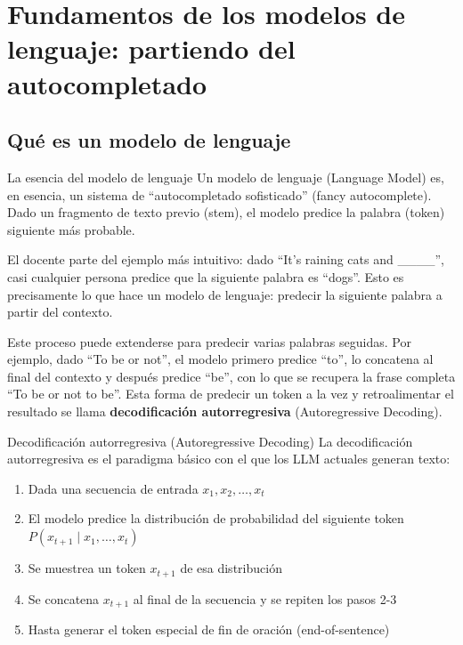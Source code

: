 \section{Fundamentos de los modelos de lenguaje: partiendo del autocompletado}

\subsection{Qué es un modelo de lenguaje}

\begin{importantbox}{La esencia del modelo de lenguaje}
Un modelo de lenguaje (Language Model) es, en esencia, un sistema de ``autocompletado sofisticado'' (fancy autocomplete). Dado un fragmento de texto previo (stem), el modelo predice la palabra (token) siguiente más probable.
\end{importantbox}

El docente parte del ejemplo más intuitivo: dado ``It's raining cats and \_\_\_\_'', casi cualquier persona predice que la siguiente palabra es ``dogs''. Esto es precisamente lo que hace un modelo de lenguaje: predecir la siguiente palabra a partir del contexto.

Este proceso puede extenderse para predecir varias palabras seguidas. Por ejemplo, dado ``To be or not'', el modelo primero predice ``to'', lo concatena al final del contexto y después predice ``be'', con lo que se recupera la frase completa ``To be or not to be''. Esta forma de predecir un token a la vez y retroalimentar el resultado se llama \textbf{decodificación autorregresiva} (Autoregressive Decoding).

\begin{knowledgebox}{Decodificación autorregresiva (Autoregressive Decoding)}
La decodificación autorregresiva es el paradigma básico con el que los LLM actuales generan texto:
\begin{enumerate}
    \item Dada una secuencia de entrada $x_1, x_2, \dots, x_t$
    \item El modelo predice la distribución de probabilidad del siguiente token $P(x_{t+1} \mid x_1, \dots, x_t)$
    \item Se muestrea un token $x_{t+1}$ de esa distribución
    \item Se concatena $x_{t+1}$ al final de la secuencia y se repiten los pasos 2-3
    \item Hasta generar el token especial de fin de oración (end-of-sentence)
\end{enumerate}
\end{knowledgebox}

